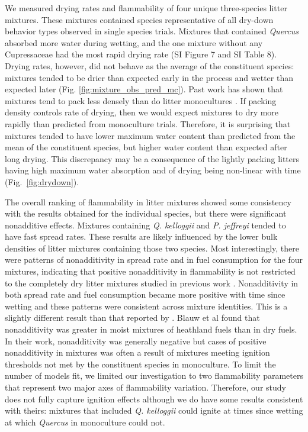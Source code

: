 \documentclass[letterpaper,12pt]{article}
\begin{document}
We measured drying rates and flammability of four unique three-species litter
mixtures. These mixtures contained species representative of all dry-down
behavior types observed in single species trials. Mixtures that contained
\emph{Quercus} absorbed more water during wetting, and the one mixture without
any Cupressaceae had the most rapid drying rate (SI Figure 7 and SI Table 8).
Drying rates, however, did not behave as the average of the constituent
species: mixtures tended to be drier than expected early in the process and
wetter than expected later (Fig. \ref{fig:mixture_obs_pred_mc}). Past work has
shown that mixtures tend to pack less densely than do litter monocultures
\citep{Magalhaes+Schwilk-2012}. If packing density controls rate of drying,
then we would expect mixtures to dry more rapidly than predicted from
monoculture trials. Therefore, it is surprising that mixtures tended to have
lower maximum water content than predicted from the mean of the constituent
species, but higher water content than expected after long drying. This
discrepancy may be a consequence of the lightly packing litters having high
maximum water absorption and of drying being non-linear with time
(Fig.~\ref{fig:drydown}).

The overall ranking of flammability in litter mixtures showed some consistency
with the results obtained for the individual species, but there were
significant nonadditive effects. Mixtures containing \emph{Q. kelloggii} and
\emph{P. jeffreyi} tended to have fast spread rates. These results are likely
influenced by the lower bulk densities of litter mixtures containing those two
species. Most interestingly, there were patterns of nonadditivity in spread
rate and in fuel consumption for the four mixtures, indicating that positive
nonadditivity in flammability is not restricted to the completely dry litter
mixtures studied in previous work \citep{Magalhaes+Schwilk-2012,
  VanAltena+Logtestjin+etal-2012}. Nonadditivity in both spread rate and fuel
consumption became more positive with time since wetting and these patterns
were consistent across mixture identities. This is a slightly different result
than that reported by \citet{Blauw+Wensink+etal-2015}. Blauw et
al found that nonadditivity was greater in moist mixtures of heathland fuels
than in dry fuels. In their work, nonadditivity was generally negative but
cases of positive nonadditivity in mixtures was often a result of mixtures
meeting ignition thresholds not met by the constituent species in monoculture.
To limit the number of models fit, we limited our investigation to two
flammability parameters that represent two major axes of flammability
variation. Therefore, our study does not fully capture ignition effects
although we do have some results consistent with theirs: mixtures that included
\emph{Q. kelloggii} could ignite at times since wetting at which \emph{Quercus}
in monoculture could not.
\end{document}

